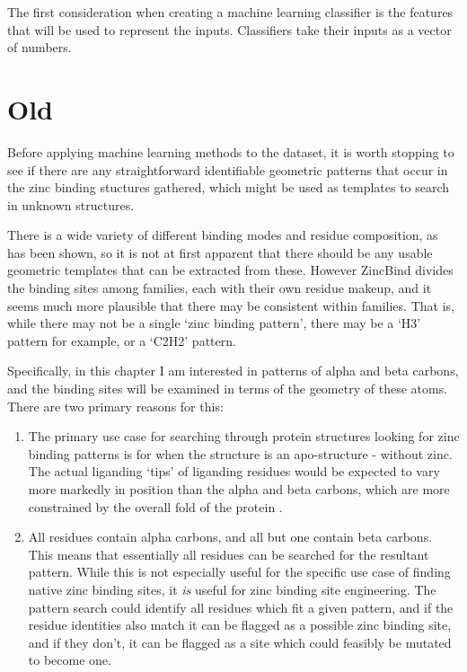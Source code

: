 The first consideration when creating a machine learning classifier is the features that will be used to represent the inputs. Classifiers take their inputs as a vector of numbers.


\section{Old}


Before applying machine learning methods to the dataset, it is worth stopping to see if there are any straightforward identifiable geometric patterns that occur in the zinc binding stuctures gathered, which might be used as templates to search in unknown structures.

There is a wide variety of different binding modes and residue composition, as has been shown, so it is not at first apparent that there should be any usable geometric templates that can be extracted from these. However ZincBind divides the binding sites among families, each with their own residue makeup, and it seems much more plausible that there may be consistent within families. That is, while there may not be a single `zinc binding pattern', there may be a `H3' pattern for example, or a `C2H2' pattern.

Specifically, in this chapter I am interested in patterns of alpha and beta carbons, and the binding sites will be examined in terms of the geometry of these atoms. There are two primary reasons for this:

\begin{enumerate}
   \item The primary use case for searching through protein structures looking for zinc binding patterns is for when the structure is an apo-structure - without zinc. The actual liganding `tips' of liganding residues would be expected to vary more markedly in position than the alpha and beta carbons, which are more constrained by the overall fold of the protein .
   \item All residues contain alpha carbons, and all but one contain beta carbons. This means that essentially all residues can be searched for the resultant pattern. While this is not especially useful for the specific use case of finding native zinc binding sites, it \emph{is} useful for zinc binding site engineering. The pattern search could identify all residues which fit a given pattern, and if the residue identities also match it can be flagged as a possible zinc binding site, and if they don't, it can be flagged as a site which could feasibly be mutated to become one.
\end{enumerate}

